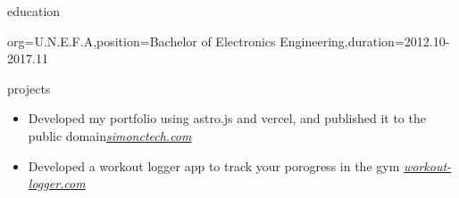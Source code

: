 \documentclass{resume}
\begin{document}
\begin{ResumeSection}{education}
    \begin{ResumeSubsection}{org={U.N.E.F.A},position={Bachelor of Electronics Engineering},duration={2012.10-2017.11}}
    \end{ResumeSubsection}
\end{ResumeSection}

\begin{ResumeSection}{projects}
    \begin{itemize}
        \item Developed my portfolio using astro.js and vercel, and published it to the public domain\hfill\em{{\href{https://www.simonctech.com}{simonctech.com}}}
    \end{itemize}
    \begin{itemize}
        \item Developed a workout logger app to track your porogress in the gym \hfill\em{{\href{https://workout-logger-sable.vercel.app/}{workout-logger.com}}}
    \end{itemize}
\end{ResumeSection}
\end{document}
